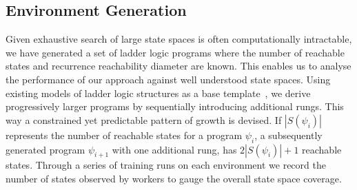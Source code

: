 \documentclass[runningheads]{llncs}
\begin{document}


\subsection{Environment Generation} 
Given exhaustive search of large state spaces is often computationally intractable, we have generated a set of ladder logic programs where the number of reachable states and recurrence reachability diameter are known. This enables us to analyse the performance of our approach against well understood state spaces. Using existing models of ladder logic structures as a base template~\cite{james2013verification}, we derive progressively larger programs by sequentially introducing additional rungs. This way a constrained yet predictable pattern of growth is devised. If $|S(\psi_i)|$ represents the number of reachable states for a program $\psi_i$, a subsequently generated program $\psi_{i+1}$ with one additional rung, has $2|S(\psi_i)|+1$ reachable states. Through a series of training runs on each environment we record the number of states observed by workers to gauge the overall state space coverage. 
\end{document}
